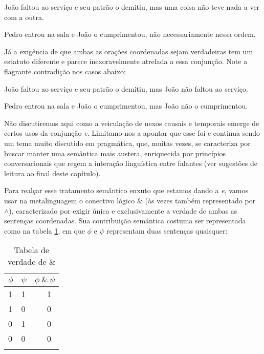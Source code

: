 \begin{exe}
	\ex João faltou ao serviço e seu patrão o demitiu, mas uma coisa não teve nada a ver com a outra. \label{demc}

	\ex Pedro entrou na sala e João o cumprimentou, não necessariamente nessa ordem. \label{cumc}	
\end{exe}

Já a exigência de que ambas as orações coordenadas sejam verdadeiras tem um estatuto diferente e parece inexoravelmente atrelada a essa conjunção. Note a flagrante contradição nos casos abaixo:

\begin{exe}
	\ex João faltou ao serviço e seu patrão o demitiu, mas João não faltou ao serviço. \label{demct}
	
	\ex Pedro entrou na sala e João o cumprimentou, mas João não o cumprimentou. \label{cumct}	
\end{exe}

Não discutiremos aqui como a veiculação de nexos causais e temporais emerge de certos usos da conjunção \textit{e}. Limitamo-nos a apontar que esse foi e continua sendo um tema muito discutido em pragmática, que, muitas vezes, se caracteriza por buscar manter uma semântica mais austera, enriquecida por princípios conversacionais que regem a interação linguística entre falantes (ver sugestões de leitura ao final deste capítulo).

Para realçar esse tratamento semântico enxuto que estamos dando a \textit{e}, vamos usar na metalinguagem o conectivo lógico $\&$ (às vezes também representado por $\land$), caracterizado por exigir única e exclusivamente a verdade de ambas as sentenças coordenadas. Sua contribuição semântica costuma ser representada como na tabela \ref{tabelae}, em que $\phi$ e $\psi$ representam duas sentenças quaisquer:

\begin{table}
	\begin{tabularx}{.4\textwidth}{XXX}
		\lsptoprule
		$\phi$ & $\psi$ & $\phi\ \&\ \psi$ \\
		\midrule 
		1 & 1 & \ \ \ 1 \\  
		1 & 0 & \ \ \ 0 \\ 
		0 & 1 & \ \ \ 0 \\ 
		0 & 0 & \ \ \ 0 \\
		\lspbottomrule
	\end{tabularx}
\caption{Tabela de verdade de $\&$}
\label{tabelae}
\end{table}


